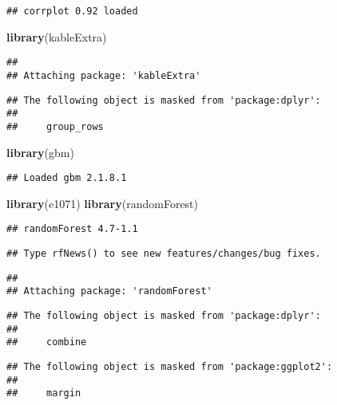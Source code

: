 \documentclass[
]{article}
\newenvironment{Shaded}{\begin{snugshade}}{\end{snugshade}}
\newcommand{\FunctionTok}[1]{\textcolor[rgb]{0.13,0.29,0.53}{\textbf{#1}}}
\newcommand{\NormalTok}[1]{#1}
\begin{document}
\begin{verbatim}
## corrplot 0.92 loaded
\end{verbatim}

\begin{Shaded}
\begin{Highlighting}[]
\FunctionTok{library}\NormalTok{(kableExtra)}
\end{Highlighting}
\end{Shaded}

\begin{verbatim}
## 
## Attaching package: 'kableExtra'
\end{verbatim}

\begin{verbatim}
## The following object is masked from 'package:dplyr':
## 
##     group_rows
\end{verbatim}

\begin{Shaded}
\begin{Highlighting}[]
\FunctionTok{library}\NormalTok{(gbm)}
\end{Highlighting}
\end{Shaded}

\begin{verbatim}
## Loaded gbm 2.1.8.1
\end{verbatim}

\begin{Shaded}
\begin{Highlighting}[]
\FunctionTok{library}\NormalTok{(e1071)}
\FunctionTok{library}\NormalTok{(randomForest)}
\end{Highlighting}
\end{Shaded}

\begin{verbatim}
## randomForest 4.7-1.1
\end{verbatim}

\begin{verbatim}
## Type rfNews() to see new features/changes/bug fixes.
\end{verbatim}

\begin{verbatim}
## 
## Attaching package: 'randomForest'
\end{verbatim}

\begin{verbatim}
## The following object is masked from 'package:dplyr':
## 
##     combine
\end{verbatim}

\begin{verbatim}
## The following object is masked from 'package:ggplot2':
## 
##     margin
\end{verbatim}
\end{document}

